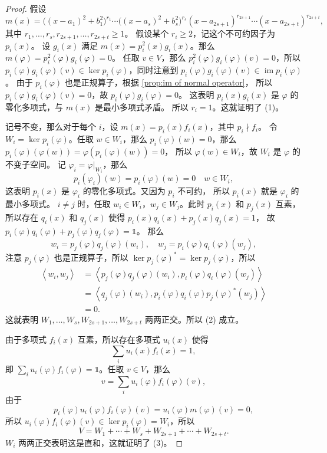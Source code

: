 \documentclass[fontset=none,zihao=-4]{Notes}
\DeclareMathOperator\im{im}
\newcommand{\inn}[1]{\left\langle#1\right\rangle}
\begin{document}
\begin{proof}
  假设
  \[
    m(x)=\bigl((x-a_1)^2+b_1^2\bigr)^{r_1}\cdots
    \bigl((x-a_s)^2+b_s^2\bigr)^{r_s}(x-a_{2s+1})^{r_{2s+1}}\cdots(x-a_{2s+t})
    ^{r_{2s+t}},
  \]
  其中 $r_1,\dots,r_s,r_{2s+1},\dots,r_{2s+t}\geq 1$。
  假设某个 $r_i\geq 2$，记这个不可约因子为 $p_i(x)$。
  设 $g_i(x)$ 满足 $m(x)=p_i^2(x)g_i(x)$。那么 $m(\varphi)=p_i^2(\varphi)g_i(\varphi)=0$。
  任取 $v\in V$，那么 $p_i^2(\varphi)g_i(\varphi)(v)=0$，所以
  $p_i(\varphi)g_i(\varphi)(v)\in\ker p_i(\varphi)$，同时注意到
  $p_i(\varphi)g_i(\varphi)(v)\in\im p_i(\varphi)$。
  由于 $p_i(\varphi)$ 也是正规算子，根据 \autoref{prop:im of normal operator}，
  所以 $p_i(\varphi)g_i(\varphi)(v)=0$，故 $p_i(\varphi)g_i(\varphi)=0$。
  这表明 $p_i(x)g_i(x)$ 是 $\varphi$ 的零化多项式，与 $m(x)$ 是最小多项式矛盾。
  所以 $r_i=1$。这就证明了 (1)。

  记号不变，那么对于每个 $i$，设 $m(x)=p_i(x)f_i(x)$，其中 $p_i\nmid f_i$。
  令 $W_i=\ker p_i(\varphi)$。任取 $w\in W_i$，那么
  $p_i(\varphi)(w)=0$，那么 $p_i(\varphi)(\varphi(w))=\varphi(p_i(\varphi)(w))=0$，
  所以 $\varphi(w)\in W_i$，故 $W_i$ 是 $\varphi$ 的不变子空间。
  记 $\varphi_i=\varphi|_{W_i}$，那么
  \[
    p_i(\varphi_i)(w)=p_i(\varphi)(w)=0\quad w\in W_i,
  \]
  这表明 $p_i(x)$ 是 $\varphi_i$ 的零化多项式。又因为 $p_i$ 不可约，
  所以 $p_i(x)$ 就是 $\varphi_i$ 的最小多项式。
  $i\neq j$ 时，任取 $w_i\in W_i$，$w_j\in W_j$。此时 $p_i(x)$ 和 $p_j(x)$
  互素，所以存在 $q_i(x)$ 和 $q_j(x)$ 使得 $p_i(x)q_i(x)+p_j(x)q_j(x)=1$，
  故 $p_i(\varphi)q_i(\varphi)+p_j(\varphi)q_j(\varphi)=\mathbb{1}$。
  那么
  \[
    w_i=p_j(\varphi)q_j(\varphi)(w_i),\quad
    w_j=p_i(\varphi)q_i(\varphi)(w_j),  
  \]
  注意 $p_j(\varphi)$ 也是正规算子，所以 $\ker p_j(\varphi)^*=\ker p_j(\varphi)$，所以
  \begin{align*}
    \inn{w_i,w_j}&=\inn{p_j(\varphi)q_j(\varphi)(w_i),p_i(\varphi)q_i(\varphi)(w_j)}\\
    &=\inn{q_j(\varphi)(w_i),p_i(\varphi)q_i(\varphi)p_j(\varphi)^*(w_j)}\\
    &=0.
  \end{align*}
  这就表明 $W_1,\dots,W_s,W_{2s+1},\dots,W_{2s+t}$ 两两正交。所以 (2) 成立。

  由于多项式 $f_i(x)$ 互素，所以存在多项式 $u_i(x)$
  使得
  \[
    \sum_i u_i(x)f_i(x)=1,  
  \]
  即 $\sum_i u_i(\varphi)f_i(\varphi)=\mathbb{1}$。任取 $v\in V$，那么
  \[
    v=\sum_i u_i(\varphi)f_i(\varphi)(v),  
  \]
  由于
  \[
    p_i(\varphi)  u_i(\varphi)f_i(\varphi)(v)=u_i(\varphi)m(\varphi)(v)=0,
  \]
  所以 $u_i(\varphi)f_i(\varphi)(v)\in\ker p_i(\varphi)=W_i$，所以
  \[
    V= W_1+\cdots+ W_s+ W_{2s+1}+ \cdots+ W_{2s+t}.
  \]
  $W_i$ 两两正交表明这是直和，这就证明了 (3)。
\end{proof}
\end{document}
